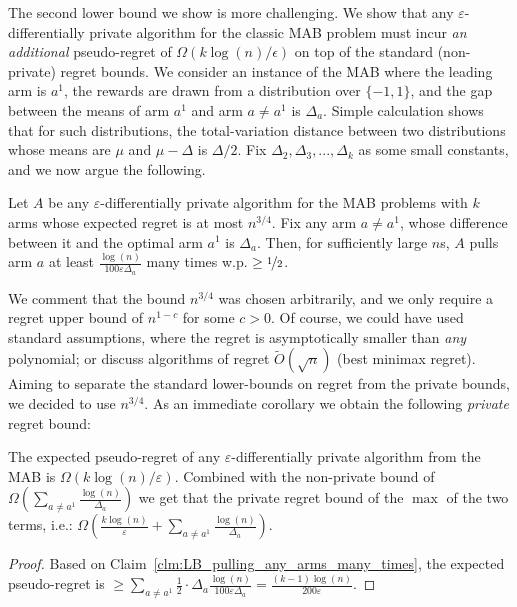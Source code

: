 \documentclass{article}
\begin{document}
The second lower bound we show is more challenging. We show that any $\varepsilon$-differentially private algorithm for the classic MAB problem must incur \emph{an additional} pseudo-regret of $\Omega( k\log(n)/\epsilon)$ on top of the standard (non-private) regret bounds.  We consider an instance of the MAB where the leading arm is $a^1$, the rewards are drawn from a distribution over $\{-1,1\}$, and the gap between the means of arm $a^1$ and arm $a\neq a^1$ is $\Delta_a$. Simple calculation shows that for such distributions, the total-variation distance between two distributions whose means are $\mu$ and $\mu-\Delta$ is $\Delta/2$. Fix $\Delta_2, \Delta_3,...,\Delta_k$ as some small constants, and we now argue the following.
\begin{claim}
\label{clm:LB_pulling_any_arms_many_times}
Let $A$ be any $\varepsilon$-differentially private algorithm for the MAB problems with $k$ arms whose expected regret is at most $n^{3/4}$. Fix any arm $a\neq a^1$, whose difference between it and the optimal arm $a^1$ is $\Delta_a$. Then, for sufficiently large $n$s, $A$ pulls arm $a$ at least $\tfrac {\log(n)}{100\varepsilon\Delta_a}$ many times w.p. $\geq \nicefrac 1 2$.
\end{claim}
We comment that the bound $n^{3/4}$ was chosen arbitrarily, and we only require a regret upper bound of $n^{1-c}$ for some $c>0$. Of course, we could have used standard assumptions, where the regret is asymptotically smaller than \emph{any} polynomial; or discuss algorithms of regret $\tilde O(\sqrt n)$ (best minimax regret). Aiming to separate the standard lower-bounds on regret from the private bounds, we decided to use $n^{3/4}$.
As an immediate corollary we obtain the following \emph{private} regret bound:
\begin{corollary}
\label{cor:LB_private_MAB}
The expected pseudo-regret of any $\varepsilon$-differentially private algorithm from the MAB is $\Omega(k\log(n)/\varepsilon)$. Combined with the non-private bound of $\Omega\left( \sum_{a\neq a^1} \tfrac{\log(n)}{\Delta_a}\right)$ we get that the private regret bound of the $\max$ of the two terms, i.e.: $\Omega\left( \tfrac {k\log(n)}{\varepsilon}+\sum\limits_{a\neq a^1} \tfrac{\log(n)}{\Delta_a}\right)$.
\end{corollary}
\begin{proof}
Based on Claim~\ref{clm:LB_pulling_any_arms_many_times}, the expected pseudo-regret is $\geq \sum\limits_{a\neq a^1} \tfrac 1 2 \cdot \Delta_a \tfrac{\log(n)}{100 \varepsilon\Delta_a} = \tfrac{(k-1)\log(n)}{200\varepsilon}$.
\end{proof}
\end{document}
